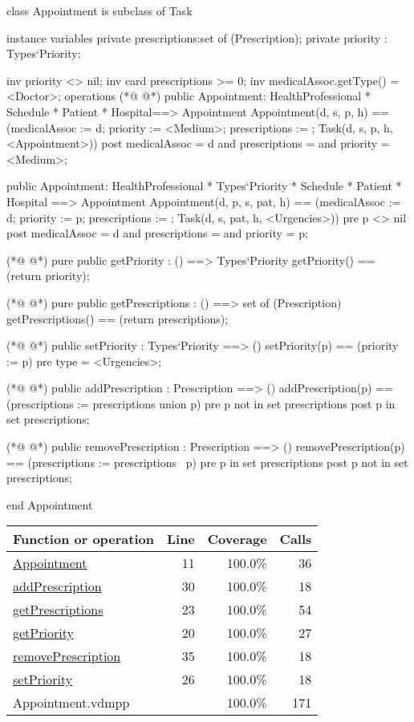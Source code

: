 \begin{vdmpp}[breaklines=true]
class Appointment is subclass of Task

instance variables
  private prescriptions:set of (Prescription);
  private priority : Types`Priority;
  
  inv priority <> nil;
  inv card prescriptions >= 0;
  inv medicalAssoc.getType() = <Doctor>;
operations
(*@
\label{Appointment:11}
@*)
 public Appointment: HealthProfessional * Schedule * Patient * Hospital==> Appointment
  Appointment(d, s, p, h) == (medicalAssoc := d; priority := <Medium>; prescriptions := {}; Task(d, s, p, h, <Appointment>))
 post medicalAssoc = d and prescriptions = {} and priority = <Medium>;
 
 public Appointment: HealthProfessional * Types`Priority * Schedule * Patient * Hospital ==> Appointment
  Appointment(d, p, s, pat, h) == (medicalAssoc := d; priority := p; prescriptions := {}; Task(d, s, pat, h, <Urgencies>))
 pre p <> nil
 post medicalAssoc = d and prescriptions = {} and priority = p;

(*@
\label{getPriority:20}
@*)
 pure public getPriority : () ==> Types`Priority
  getPriority() == (return priority);
 
(*@
\label{getPrescriptions:23}
@*)
  pure public getPrescriptions : () ==> set of (Prescription)
   getPrescriptions() == (return prescriptions);
  
(*@
\label{setPriority:26}
@*)
  public setPriority : Types`Priority ==> ()
   setPriority(p) == (priority := p)
  pre type = <Urgencies>;
  
(*@
\label{addPrescription:30}
@*)
  public addPrescription : Prescription ==> ()
   addPrescription(p) == (prescriptions := prescriptions union {p})
  pre p not in set prescriptions
  post p in set prescriptions;
                 
(*@
\label{removePrescription:35}
@*)
 public removePrescription : Prescription ==> ()
   removePrescription(p) == (prescriptions := prescriptions \ {p})
  pre p in set prescriptions
  post p not in set prescriptions;
   
end Appointment
\end{vdmpp}
\bigskip
\begin{longtable}{|l|r|r|r|}
\hline
Function or operation & Line & Coverage & Calls \\
\hline
\hline
\hyperref[Appointment:11]{Appointment} & 11&100.0\% & 36 \\
\hline
\hyperref[addPrescription:30]{addPrescription} & 30&100.0\% & 18 \\
\hline
\hyperref[getPrescriptions:23]{getPrescriptions} & 23&100.0\% & 54 \\
\hline
\hyperref[getPriority:20]{getPriority} & 20&100.0\% & 27 \\
\hline
\hyperref[removePrescription:35]{removePrescription} & 35&100.0\% & 18 \\
\hline
\hyperref[setPriority:26]{setPriority} & 26&100.0\% & 18 \\
\hline
\hline
Appointment.vdmpp & & 100.0\% & 171 \\
\hline
\end{longtable}

